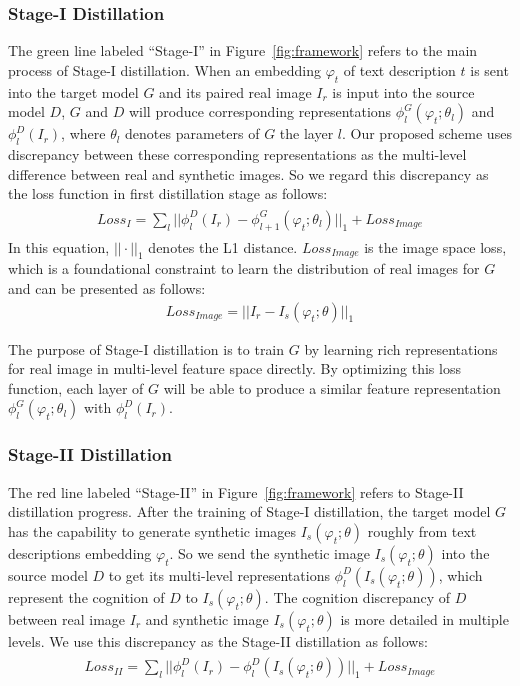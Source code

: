 \documentclass[sigconf]{acmart}
\begin{document}
\subsubsection{Stage-I Distillation}
The green line labeled ``Stage-I'' in Figure~\ref{fig:framework} refers to the main process of Stage-I distillation. When an embedding $\varphi_t$ of text description $t$ is sent into the target model $G$ and its paired real image $I_r$ is input into the source model $D$, $G$ and $D$ will produce corresponding representations $\phi_l^G(\varphi_t;\theta_l)$ and $\phi_l^D(I_r)$, where $\theta_l$ denotes parameters of $G$ the layer $l$. Our proposed scheme uses discrepancy between these corresponding representations as the multi-level difference between real and synthetic images. So we regard this discrepancy as the loss function in first distillation stage as follows:
\begin{align}
	\begin{split}
		Loss_{I} = \sum_l || \phi_l^D(I_r) - \phi_{l+1}^G(\varphi_t;\theta_l) ||_1 + Loss_{Image}
	\end{split}
\end{align}
In this equation, $||\cdot||_1$ denotes the L1 distance.  $ Loss_{Image}$ is the image space loss, which is a foundational constraint to learn the distribution of real images for $G$ and can be presented as follows:
\begin{align}
	Loss_{Image} = || I_r - I_s(\varphi_t;\theta) ||_1
\end{align}

The purpose of Stage-I distillation is to train $G$ by learning rich representations for real image in multi-level feature space directly. By optimizing this loss function, each layer of $G$ will be able to produce a similar feature representation $\phi_l^G(\varphi_t;\theta_l)$ with $\phi_l^D(I_r)$.

\subsubsection{Stage-II Distillation}
The red line labeled ``Stage-II'' in Figure~\ref{fig:framework} refers to Stage-II distillation progress. After the training of Stage-I distillation, the target model $G$ has the capability to generate synthetic images $I_s(\varphi_t;\theta)$ roughly from text descriptions embedding $\varphi_t$. So we send the synthetic image $I_s(\varphi_t;\theta)$ into the source model $D$ to get its multi-level representations $\phi_l^D(I_s(\varphi_t;\theta))$, which represent the cognition of $D$ to $I_s(\varphi_t;\theta)$. The cognition discrepancy of $D$ between real image $I_r$ and synthetic image $I_s(\varphi_t;\theta)$ is more detailed in multiple levels. We use this discrepancy as the Stage-II distillation as follows:
\begin{align}
	\begin{split}
		Loss_{II} = \sum_l || \phi_l^D(I_r) - \phi_l^D(I_s(\varphi_t;\theta)) ||_1 + Loss_{Image}
	\end{split}
\end{align}
\end{document}
